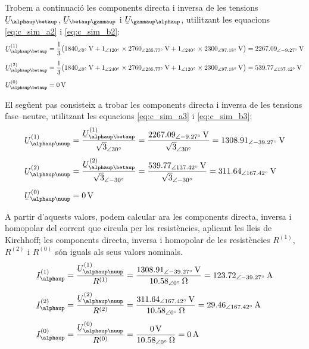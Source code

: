 \begin{exemple}
Trobem a continuaci\'{o} les components directa i inversa de les
tensions $\cmplx{U}_{\alphaup\betaup}$, $\cmplx{U}_{\betaup\gammaup}$ i
$\cmplx{U}_{\gammaup\alphaup}$, utilitzant les equacions
\eqref{eq:c_sim_a2} i \eqref{eq:c_sim_b2}:
\begin{align*}
\cmplx{U}_{\alphaup\betaup}\ap{(1)} &= \frac{1}{3} \big(
\SIpd{1840}{0}{V} + \numpd{1}{120} \times \SIpd{2760}{235,77}{V} +
\numpd{1}{240} \times \SIpd{2300}{97,18}{V}\big) = \SIpd{2267,09}{-9,27}{V} \\[1ex]
\cmplx{U}_{\alphaup\betaup}\ap{(2)} &= \frac{1}{3} \big(
\SIpd{1840}{0}{V} + \numpd{1}{240} \times \SIpd{2760}{235,77}{V} +
\numpd{1}{120} \times \SIpd{2300}{97,18}{V} \big) = \SIpd{539,77}{137,42}{V} \\[1ex]
\cmplx{U}_{\alphaup\betaup}\ap{(0)} &= \SI{0}{V}
\end{align*}

El seg\"{u}ent pas consisteix a trobar les components directa i inversa
de les tensions fase--neutre, utilitzant les equacions
\eqref{eq:c_sim_a3} i \eqref{eq:c_sim_b3}:
\begin{align*}
\cmplx{U}_{\alphaup\nuup}\ap{(1)} &=
\frac{\cmplx{U}_{\alphaup\betaup}\ap{(1)}}{\sqrt{3}_{\angle\ang{30}}} =
\frac{\SIpd{2267,09}{-9,27}{V}}{\sqrt{3}_{\angle\ang{30}}} =
\SIpd{1308,91}{-39,27}{V} \\[1ex]
\cmplx{U}_{\alphaup\nuup}\ap{(2)} &=
\frac{\cmplx{U}_{\alphaup\betaup}\ap{(2)}}{\sqrt{3}_{\angle\ang{-30}}} =
\frac{\SIpd{539,77}{137,42}{V}}{\sqrt{3}_{\angle\ang{-30}}} =
\SIpd{311,64}{167,42}{V} \\[1ex]
\cmplx{U}_{\alphaup\nuup}\ap{(0)} &= \SI{0}{V}
\end{align*}

A partir d'aquests valors, podem calcular ara les components
directa, inversa i homopolar del corrent que circula per les
resist\`{e}ncies, aplicant les lleis de Kirchhoff; les components
directa, inversa i homopolar de les resist\`{e}ncies $R^{(1)}$,
$R^{(2)}$ i $R^{(0)}$ s\'{o}n iguals als seus valors nominals.
\begin{align*}
\cmplx{I}_\alphaup\ap{(1)} &=
\frac{\cmplx{U}_{\alphaup\nuup}\ap{(1)}}{R^{(1)}} =
\frac{\SIpd{1308,91}{-39,27}{V}}{\SIpd{10,58}{0}{\ohm}} =
\SIpd{123,72}{-39,27}{A} \\[1ex]
\cmplx{I}_\alphaup\ap{(2)} &=
\frac{\cmplx{U}_{\alphaup\nuup}\ap{(2)}}{R^{(2)}} =
\frac{\SIpd{311,64}{167,42}{V}}{\SIpd{10,58}{0}{\ohm}} =
\SIpd{29,46}{167,42}{A} \\[1ex]
\cmplx{I}_\alphaup\ap{(0)} &=
\frac{\cmplx{U}_{\alphaup\nuup}\ap{(0)}}{R^{(0)}} =
\frac{\SI{0}{V}}{\SIpd{10,58}{0}{\ohm}} =
\SI{0}{A}
\end{align*}


\end{exemple}
